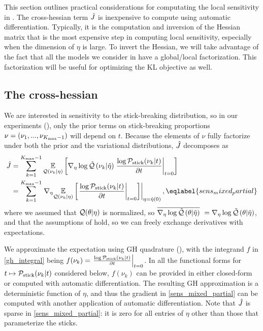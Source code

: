 
This section outlines practical considerations for computating
the local sensitivity in .
The cross-hessian term $\hat J$
is inexpensive to compute using automatic differentiation.
Typically, it is the computation and inversion of the Hessian matrix that is
the most expensive step in computing local sensitivity,
especially when the dimension of $\eta$ is large.
To invert the Hessian, we will take advantage of the fact that
all the models we consider in  have a global/local factorization.
This factorization will be useful for optimizing the $\mathrm{KL}$ objective
as well.

\subsection{The cross-hessian}


We are interested in sensitivity to the stick-breaking distribution,
so in our experiments (),
only the prior terms on stick-breaking proportions
$\nu = (\nu_1, ..., \nu_{{K_{\mathrm{max}}} - 1})$ will depend on $t$.
Because the elements of $\nu$ fully factorize
under both the prior and the variational distributions,
$\hat J$ decomposes as
\begin{align}
  \crosshessian &=
  \sum_{\k=1}^{\kmax - 1}
          \expect{\q(\nuk \vert \eta)}
                 {
                 \lqgrad{\nuk \vert \etaopt}
                 \fracat{\log \pstick(\nuk \vert \t)}{\partial \t}{\t = 0}
                 } \notag\\
  &= \sum_{\k=1}^{\kmax - 1}
         \evalat{\nabla_\eta \expect{\q(\nuk \vert \eta)}
                {
                \fracat{\log \pstick(\nuk \vert \t)}{\partial \t}{\t = 0}
                }}{\eta = \etaopt(0)},
\eqlabel{sens_mixed_partial}
\end{align}
where we assumed that $\mathcal{Q}(\theta \vert \eta)$ is normalized, so
$\overline{{\nabla_\eta \log \tilde{\mathcal{Q}}}\left(\theta \vert \hat\eta\right)}\,\, = {\nabla_\eta \log \tilde{\mathcal{Q}}}\left(\theta \vert \hat\eta\right)$,
and that the assumptions of  hold, so we
can freely exchange derivatives with expectations.

We approximate the expectation using GH quadrature (),
with the integrand $f$ in \eqref{gh_integral} being
$f(\nu_k) = \left.\frac{\log \mathcal{P}_{\mathrm{stick}}(\nu_{k} \vert t)}{\partial t}\right\vert_{t = 0}$.
In all the functional forms for
$t \mapsto \mathcal{P}_{\mathrm{stick}}(\nu_{k} \vert t)$ considered below,
$f(\nu_k)$ can be provided in either closed-form or computed with automatic differentiation.
The resulting GH approximation is a deterministic function of $\eta$,
and thus the gradient in \eqref{sens_mixed_partial} can be computed
with another application of automatic differentiation.
Note that $\hat J$ is sparse in \eqref{sens_mixed_partial}:
it is zero for all entries of
$\eta$ other than those that parameterize the sticks.

